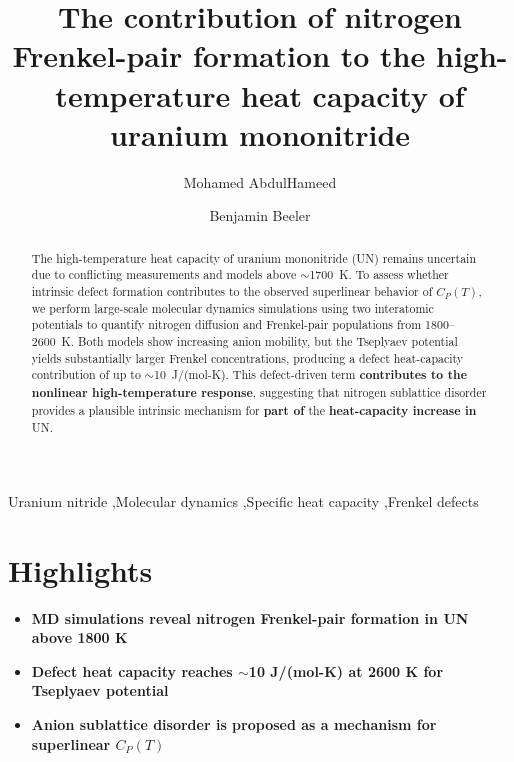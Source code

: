 \documentclass[preprint,12pt,sort&compress]{elsarticle}
\newcommand{\?}{\stackrel{?}{=}}
\providecommand{\DIFaddtex}[1]{{\bf #1}} %
\providecommand{\DIFdeltex}[1]{} %
\providecommand{\DIFaddbegin}{\protect\color{blue}} %
\providecommand{\DIFaddend}{\protect\color{black}} %
\providecommand{\DIFdelbegin}{\protect\color{red}} %
\providecommand{\DIFdelend}{\protect\color{black}} %
\providecommand{\DIFadd}[1]{\texorpdfstring{\DIFaddtex{#1}}{#1}} %
\providecommand{\DIFdel}[1]{\texorpdfstring{\DIFdeltex{#1}}{}} %
\newcommand{\DIFscaledelfig}{0.5}
\newlength{\DIFdelgraphicswidth} %
\newlength{\DIFdelgraphicsheight} %
\newcommand{\DIFaddincludegraphics}[2][]{{\color{blue}\fbox{\DIFOincludegraphics[#1]{#2}}}} %
\newcommand{\DIFdelincludegraphics}[2][]{%
\sbox{\DIFdelgraphicsbox}{\DIFOincludegraphics[#1]{#2}}%
\settoboxwidth{\DIFdelgraphicswidth}{\DIFdelgraphicsbox} %
\settoboxtotalheight{\DIFdelgraphicsheight}{\DIFdelgraphicsbox} %
\scalebox{\DIFscaledelfig}{%
\parbox[b]{\DIFdelgraphicswidth}{\usebox{\DIFdelgraphicsbox}\\[-\baselineskip] \rule{\DIFdelgraphicswidth}{0em}}\llap{\resizebox{\DIFdelgraphicswidth}{\DIFdelgraphicsheight}{%
\setlength{\unitlength}{\DIFdelgraphicswidth}%
\begin{picture}(1,1)%
\thicklines\linethickness{2pt} %
{\color[rgb]{1,0,0}\put(0,0){\framebox(1,1){}}}%
{\color[rgb]{1,0,0}\put(0,0){\line( 1,1){1}}}%
{\color[rgb]{1,0,0}\put(0,1){\line(1,-1){1}}}%
\end{picture}%
}\hspace*{3pt}}} %
} %
\DeclareRobustCommand{\DIFaddbegin}{\DIFOaddbegin \let\includegraphics\DIFaddincludegraphics} %
\DeclareRobustCommand{\DIFaddend}{\DIFOaddend \let\includegraphics\DIFOincludegraphics} %
\DeclareRobustCommand{\DIFdelbegin}{\DIFOdelbegin \let\includegraphics\DIFdelincludegraphics} %
\DeclareRobustCommand{\DIFdelend}{\DIFOaddend \let\includegraphics\DIFOincludegraphics} %
\begin{document}
\begin{frontmatter}

\title{The contribution of nitrogen Frenkel-pair formation to the high-temperature heat capacity of uranium mononitride}

\author[ncsu,unsw]{Mohamed AbdulHameed}
\author[ncsu,inl]{Benjamin Beeler}

\address[ncsu]{Department of Nuclear Engineering, North Carolina State University, Raleigh, NC 27695, USA}
\address[inl]{Idaho National Laboratory, Idaho Falls, ID 83415, USA}
\address[unsw]{School of Mechanical and Manufacturing Engineering, UNSW Sydney, Sydney, NSW 2052, Australia}

\begin{abstract}

The high-temperature heat capacity of uranium mononitride (UN) remains uncertain due to conflicting measurements and models above $\sim$1700~K. To assess whether intrinsic defect formation contributes to the observed superlinear behavior of $C_P(T)$, we perform large-scale molecular dynamics simulations using two interatomic potentials to quantify nitrogen diffusion and Frenkel-pair populations from 1800--2600~K. Both models show increasing anion mobility, but the Tseplyaev potential yields substantially larger Frenkel concentrations, producing a defect heat-capacity contribution of up to $\sim$10~J/(mol-K). This defect-driven term \DIFdelbegin \DIFdel{is consistent with the curvature seen in historical correlations and recent \textit{ab initio} results}\DIFdelend \DIFaddbegin \DIFadd{contributes to the nonlinear high-temperature response}\DIFaddend , suggesting that nitrogen sublattice disorder provides a plausible intrinsic mechanism for \DIFaddbegin \DIFadd{part of }\DIFaddend the \DIFdelbegin \DIFdel{high-temperature heat capacity of }\DIFdelend \DIFaddbegin \DIFadd{heat-capacity increase in }\DIFaddend UN.

\end{abstract}

\begin{keyword}
Uranium nitride \sep Molecular dynamics \sep Specific heat capacity \sep Frenkel defects
\end{keyword}

\end{frontmatter}

\DIFaddbegin \newpage

\section*{\DIFadd{Highlights}}
\begin{itemize}

\item \DIFadd{MD simulations reveal nitrogen Frenkel-pair formation in UN above 1800 K
}\item \DIFadd{Defect heat capacity reaches $\sim$10 J/(mol-K) at 2600 K for Tseplyaev potential
}\item \DIFadd{Anion sublattice disorder is proposed as a mechanism for superlinear $C_P(T)$
}

\end{itemize}
\end{document}
